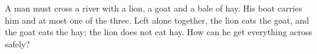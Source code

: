 A man must cross a river with a lion, a goat and a bale of hay. His boat carries him and at most one of the three. Left alone together, the lion eats the goat, and the goat eats the hay; the lion does not eat hay. How can he get everything across safely?
